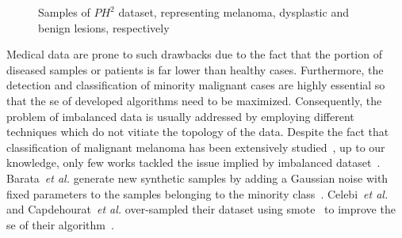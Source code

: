 \begin{figure}
\begin{center}
  \hspace*{\fill}
  \hfill
  \hfill
  \hspace*{\fill}
  \caption{Samples of $PH^2$ dataset, representing melanoma, dysplastic and benign lesions, respectively}
  \label{fig:PH2samples}
\end{center}	
\end{figure}

Medical data are prone to such drawbacks due to the fact that the portion of diseased samples or patients is far lower than healthy cases.
Furthermore, the detection and classification of minority malignant cases are highly essential so that the \ac{se} of developed algorithms need to be maximized.
Consequently, the problem of imbalanced data is usually addressed by employing different techniques which do not vitiate the topology of the data.
Despite the fact that classification of malignant melanoma has been extensively studied~\cite{rastgoo2015automatic}, up to our knowledge, only few works tackled the issue implied by imbalanced dataset~\cite{barata2013two,celebi2007methodological}.
Barata~\emph{et al.} generate new synthetic samples by adding a Gaussian noise with fixed parameters to the samples belonging to the minority class~\cite{barata2013two}.
Celebi~\emph{et al.} and Capdehourat~\emph{et al.} over-sampled their dataset using \ac{smote}~\cite{chawla2002smote} to improve the \ac{se} of their algorithm~\cite{celebi2007methodological, capdehourat2009pigmented}.

